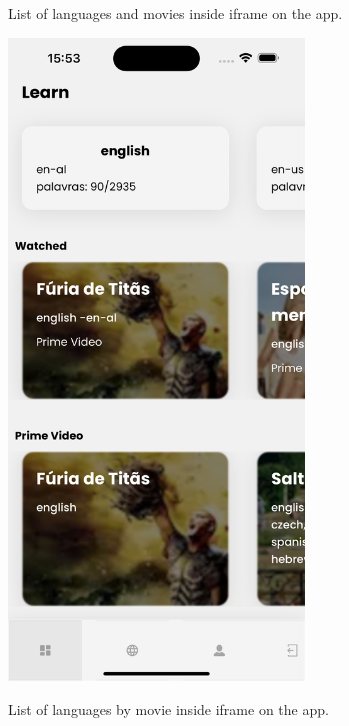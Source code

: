 \documentclass[12pt]{article}
\begin{document}
  \begin{frame}{}
    \begin{figure}[!h]
        \begin{minipage}[b]{0.31\linewidth}
          \centering
          \caption{
          List of languages and movies inside iframe on the app.
          }
          \label{fig:app2}
          \includegraphics[width=0.7\textwidth]{assets/15.png}
        \end{minipage}
        \hspace{0.1cm}
        \begin{minipage}[b]{0.31\linewidth}
          \centering
          \caption{
           List of languages by movie inside iframe on the app.
          }
          \label{fig:app5}

\end{minipage}
\end{figure}
\end{frame}
\end{document}
